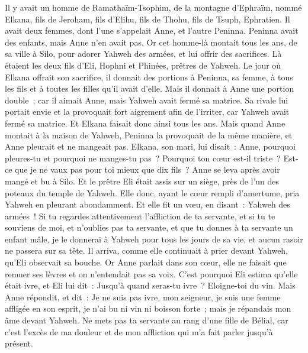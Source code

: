 \begin{multicols}{2}
\VerseOne{}Il y avait un homme de Ramathaïm-Tsophim, de la montagne d'Ephraïm, nommé Elkana, fils de Jeroham, fils d'Elihu, fils de Thohu, fils de Tsuph, Ephratien.
Il avait deux femmes, dont l'une s'appelait Anne, et l'autre Peninna. Peninna avait des enfants, mais Anne n'en avait pas.
Or cet homme-là montait tous les ans, de sa ville à Silo, pour adorer Yahweh des armées, et lui offrir des sacrifices. Là étaient les deux fils d'Eli, Hophni et Phinées, prêtres de Yahweh.
Le jour où Elkana offrait son sacrifice, il donnait des portions à Peninna, sa femme, à tous les fils et à toutes les filles qu'il avait d'elle.
Mais il donnait à Anne une portion double~; car il aimait Anne, mais Yahweh avait fermé sa matrice.
Sa rivale lui portait envie et la provoquait fort aigrement afin de l'irriter, car Yahweh avait fermé sa matrice.
Et Elkana faisait donc ainsi tous les ans. Mais quand Anne montait à la maison de Yahweh, Peninna la provoquait de la même manière, et Anne pleurait et ne mangeait pas.
Elkana, son mari, lui disait~: Anne, pourquoi pleures-tu et pourquoi ne manges-tu pas~? Pourquoi ton cœur est-il triste~? Est-ce que je ne vaux pas pour toi mieux que dix fils~?
Anne se leva après avoir mangé et bu à Silo. Et le prêtre Eli était assis sur un siège, près de l'un des poteaux du temple de Yahweh.
Elle donc, ayant le cœur rempli d'amertume, pria Yahweh en pleurant abondamment.
Et elle fit un vœu, en disant~: Yahweh des armées~! Si tu regardes attentivement l'affliction de ta servante, et si tu te souviens de moi, et n'oublies pas ta servante, et que tu donnes à ta servante un enfant mâle, je le donnerai à Yahweh pour tous les jours de sa vie, et aucun rasoir ne passera sur sa tête.
Il arriva, comme elle continuait à prier devant Yahweh, qu'Eli observait sa bouche.
Or Anne parlait dans son cœur, elle ne faisait que remuer ses lèvres et on n'entendait pas sa voix. C'est pourquoi Eli estima qu'elle était ivre,
et Eli lui dit~: Jusqu'à quand seras-tu ivre~? Eloigne-toi du vin.
Mais Anne répondit, et dit~: Je ne suis pas ivre, mon seigneur, je suis une femme affligée en son esprit, je n'ai bu ni vin ni boisson forte~; mais je répandais mon âme devant Yahweh.
Ne mets pas ta servante au rang d'une fille de Bélial, car c'est l'excès de ma douleur et de mon affliction qui m'a fait parler jusqu'à présent.

\end{multicols}
